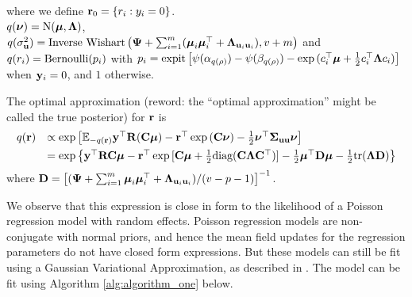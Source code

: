 \documentclass{amsart}[12pt]
\newcommand{\joc}[1]{{\color{red}#1}}
\begin{document}
\noindent 
where we define ${\bf r}_0 = \{ r_i : y_i = 0 \}$. \\
$q({\boldsymbol \nu}) = \text{N}({\boldsymbol \mu}, {\boldsymbol \Lambda})$, \\
$q(\sigma_{{\bf u}}^2) = \text{Inverse Wishart}\left({\boldsymbol \Psi} + \sum_{i=1}^m ({\boldsymbol \mu}_i {\boldsymbol \mu}_i^\top + {\boldsymbol \Lambda}_{{\bf u}_i {\bf u}_i}), v + m \right)$ \mbox{and } \\
$q(r_i) = \text{Bernoulli} (p_i)$ with
$p_i = \text{expit} \left[ \psi{(\alpha_{q(\rho)})} - \psi{(\beta_{q(\rho)})} - \exp{(c_i^\top{\boldsymbol\mu}+  \tfrac{1}{2} c_i^\top {\boldsymbol\Lambda}c_i)} \right]$ when ${\bf y}_i = 0$, and $1$ otherwise.


The optimal approximation \joc{(reword: the ``optimal approximation'' might be called the true posterior)} for
${\bf r}$ is
\[
\begin{array}{rl}
	q({\bf r}) & \propto \exp \left [ {\mathbb E}_{-q({\bf r})}{\bf y}^\top{\bf R}({\bf C}{\boldsymbol \mu}) - {\bf r}^\top\exp{({\bf C}{\boldsymbol\nu})}-\tfrac{1}{2} {\boldsymbol \nu}^\top {\boldsymbol\Sigma}_{{\bf u} {\bf u}} {\boldsymbol \nu} \right ]                                                  \\ [1ex]
	       & = \exp{ \left\{ {\bf y}^\top{\bf R}{\bf C}{\boldsymbol\mu}- {\bf r}^\top \exp{[{\bf C}{\boldsymbol\mu}+  \tfrac{1}{2} \text{diag}({\bf C}{\boldsymbol\Lambda}{\bf C}^\top)]} -  \tfrac{1}{2} {\boldsymbol\mu}^\top {\bf D}{\boldsymbol\mu}-  \tfrac{1}{2} \text{tr}({\boldsymbol\Lambda}{\bf D}) \right\} } 
\end{array}
\]
\noindent where ${\bf D} = \left[ ({\boldsymbol \Psi} + \sum_{i=1}^m {\boldsymbol \mu}_i {\boldsymbol \mu}_i^\top + {\boldsymbol \Lambda}_{{\bf u}_i{\bf u}_i}) / (v - p - 1) \right]^{-1}$. 

We observe that this expression is close in form to the likelihood of a Poisson regression model with random effects. Poisson regression models are non-conjugate with normal priors, and hence the mean field updates
for the regression parameters do not have closed form expressions. But these models can still be fit using a Gaussian Variational Approximation, as described in \citep{Ormerod2012}. The model can be fit using Algorithm
\ref{alg:algorithm_one} below.
\end{document}
